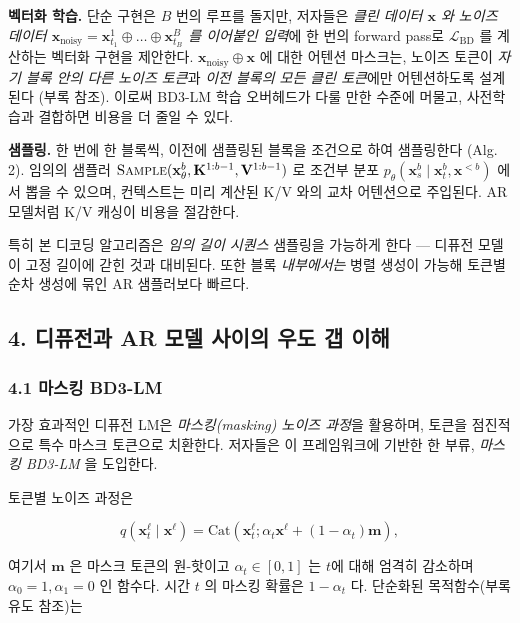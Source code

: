\documentclass[
]{article}
\begin{document}
\textbf{벡터화 학습.} 단순 구현은 \(B\) 번의 루프를 돌지만, 저자들은
\emph{클린 데이터 \(\mathbf{x}\) 와 노이즈 데이터
\(\mathbf{x}_\text{noisy} = \mathbf{x}^1_{t_1} \oplus \dots \oplus \mathbf{x}^B_{t_B}\)
를 이어붙인 입력}에 한 번의 forward pass로 \(\mathcal{L}_\text{BD}\) 를
계산하는 벡터화 구현을 제안한다.
\(\mathbf{x}_\text{noisy} \oplus \mathbf{x}\) 에 대한 어텐션 마스크는,
노이즈 토큰이 \emph{자기 블록 안의 다른 노이즈 토큰}과 \emph{이전 블록의
모든 클린 토큰}에만 어텐션하도록 설계된다 (부록 참조). 이로써 BD3-LM
학습 오버헤드가 다룰 만한 수준에 머물고, 사전학습과 결합하면 비용을 더
줄일 수 있다.

\textbf{샘플링.} 한 번에 한 블록씩, 이전에 샘플링된 블록을 조건으로 하여
샘플링한다 (Alg. 2). 임의의 샘플러
\(\textsc{Sample}(\mathbf{x}^b_\theta, \mathbf{K}^{1:b-1}, \mathbf{V}^{1:b-1})\)
로 조건부 분포
\(p_\theta(\mathbf{x}^b_s \mid \mathbf{x}^b_t, \mathbf{x}^{< b})\)
에서 뽑을 수 있으며, 컨텍스트는 미리 계산된 K/V 와의 교차 어텐션으로
주입된다. AR 모델처럼 K/V 캐싱이 비용을 절감한다.

특히 본 디코딩 알고리즘은 \emph{임의 길이 시퀀스} 샘플링을 가능하게 한다
--- 디퓨전 모델이 고정 길이에 갇힌 것과 대비된다. 또한 블록
\emph{내부에서는} 병렬 생성이 가능해 토큰별 순차 생성에 묶인 AR
샘플러보다 빠르다.

\hypertarget{uxb514uxd4e8uxc804uxacfc-ar-uxbaa8uxb378-uxc0acuxc774uxc758-uxc6b0uxb3c4-uxac2d-uxc774uxd574}{%
\subsection{4. 디퓨전과 AR 모델 사이의 우도 갭
이해}\label{uxb514uxd4e8uxc804uxacfc-ar-uxbaa8uxb378-uxc0acuxc774uxc758-uxc6b0uxb3c4-uxac2d-uxc774uxd574}}

\hypertarget{uxb9c8uxc2a4uxd0b9-bd3-lm}{%
\subsubsection{4.1 마스킹 BD3-LM}\label{uxb9c8uxc2a4uxd0b9-bd3-lm}}

가장 효과적인 디퓨전 LM은 \emph{마스킹(masking) 노이즈 과정}을 활용하며,
토큰을 점진적으로 특수 마스크 토큰으로 치환한다. 저자들은 이
프레임워크에 기반한 한 부류, \emph{마스킹 BD3-LM} 을 도입한다.

토큰별 노이즈 과정은

\[
q(\mathbf{x}^\ell_t \mid \mathbf{x}^\ell) = \text{Cat}(\mathbf{x}^\ell_t; \alpha_t \mathbf{x}^\ell + (1-\alpha_t)\mathbf{m}),
\]

여기서 \(\mathbf{m}\) 은 마스크 토큰의 원-핫이고 \(\alpha_t \in [0,1]\)
는 \(t\)에 대해 엄격히 감소하며 \(\alpha_0 = 1, \alpha_1 = 0\) 인
함수다. 시간 \(t\) 의 마스킹 확률은 \(1 - \alpha_t\) 다. 단순화된
목적함수(부록 유도 참조)는
\end{document}
